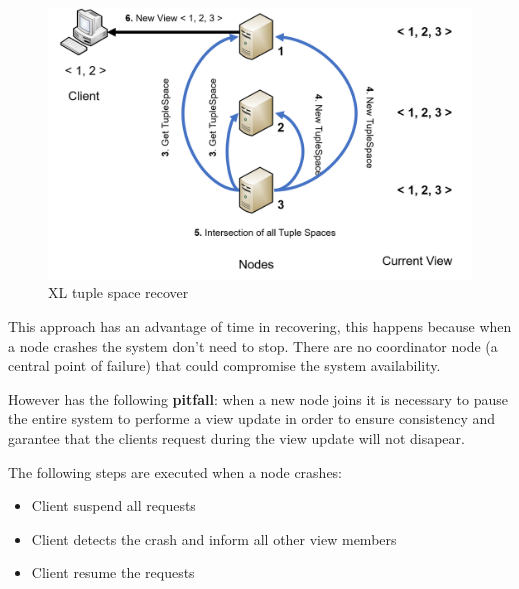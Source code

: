 \documentclass[times, 10pt,twocolumn]{article}
\begin{document}
\begin{figure}
   \includegraphics[width=\linewidth]{xl_join2.png}
   \caption{XL tuple space recover}
   \label{fig:xl_join2}
 \end{figure}


This approach has an advantage of time in recovering, this happens because when
a node crashes the system don't need to stop. There are no coordinator node
(a central point of failure) that could compromise the system availability.


However has the following \textbf{pitfall}: when a new node joins it is necessary
to pause the entire system to performe a view update in order to ensure consistency
and garantee that the clients request during the view update will not disapear.

The following steps are executed when a node crashes:
\begin{itemize}
   \item Client suspend all requests
   \item Client detects the crash and inform all other view members
   \item Client resume the requests
\end{itemize}
\end{document}
